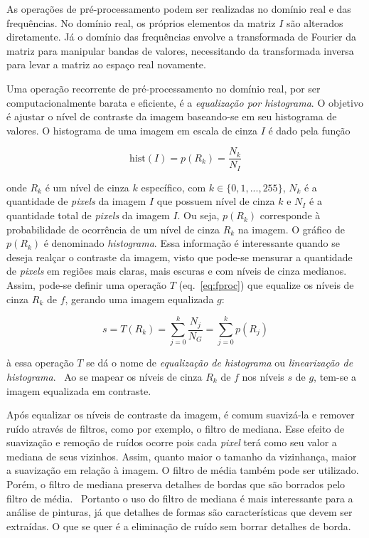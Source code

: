 As operações de pré-processamento podem ser realizadas no domínio real
e das frequências. No domínio real, os próprios elementos da matriz
$I$ são alterados diretamente. Já o domínio das frequências envolve a
transformada de Fourier da matriz para manipular bandas de valores,
necessitando da transformada inversa para levar a matriz ao espaço
real novamente.

Uma operação recorrente de pré-processamento no domínio real, por ser
computacionalmente barata e eficiente, é a \emph{equalização por
  histograma}. O objetivo é ajustar o nível de contraste da imagem
baseando-se em seu histograma de valores. O histograma de uma imagem em escala de cinza
$I$ é dado pela função

\begin{equation}
\text{hist}(I) = p(R_k) = \frac{N_k}{N_I}
\end{equation}

\noindent onde $R_k$ é um nível de cinza $k$ específico, com $k \in \{0, 1, ...,
255\}$, $N_k$ é a quantidade de
\textit{pixels} da imagem $I$ que possuem nível de cinza $k$ e $N_I$ é a quantidade total de \textit{pixels} da imagem $I$. Ou seja,
$p(R_k)$ corresponde à probabilidade de ocorrência de um nível de
cinza $R_k$ na imagem. O gráfico de $p(R_k)$ é denominado
\emph{histograma}. Essa informação é interessante quando se deseja
realçar o contraste da imagem, visto que pode-se mensurar a quantidade
de \textit{pixels} em regiões mais claras, mais escuras e com níveis de cinza
medianos. Assim, pode-se definir uma operação $T$ (eq.~\ref{eq:fproc}) que equalize os
níveis de cinza $R_k$ de $f$, gerando uma imagem equalizada $g$:

\begin{equation}
s = T(R_k) = \sum_{j=0}^k \frac{N_j}{N_G} = \sum_{j=0}^k p(R_j)
\end{equation}

\noindent à essa operação $T$ se dá o nome de \emph{equalização de
  histograma} ou \emph{linearização de histograma}.~\cite{gonzalez} Ao
se mapear os níveis de cinza $R_k$ de $f$ nos níveis $s$ de $g$,
tem-se a imagem equalizada em contraste.

Após equalizar os níveis de contraste da imagem, é comum suavizá-la e
remover ruído através de filtros, como por exemplo, o filtro de
mediana. Esse efeito de suavização e remoção de ruídos ocorre pois
cada \textit{pixel} terá como seu valor a mediana de seus
vizinhos. Assim, quanto maior o tamanho da vizinhança, maior a
suavização em relação à imagem. O filtro de média também pode ser
utilizado. Porém, o filtro de mediana preserva detalhes de bordas que
são borrados pelo filtro de média.~\cite{gonzalez} Portanto o uso do
filtro de mediana é mais interessante para a análise de pinturas, já
que detalhes de formas são características que devem ser extraídas. O
que se quer é a eliminação de ruído sem borrar detalhes de borda.

